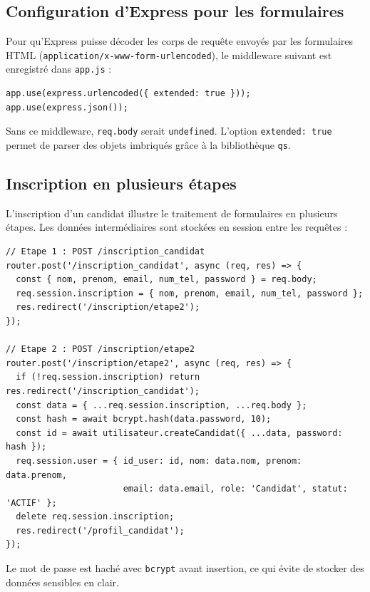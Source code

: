 \documentclass[12pt,a4paper]{article}
\begin{document}
\subsection{Configuration d'Express pour les formulaires}

Pour qu'Express puisse décoder les corps de requête envoyés par les formulaires HTML (\texttt{application/x-www-form-urlencoded}), le middleware suivant est enregistré dans \texttt{app.js} :

\begin{lstlisting}
app.use(express.urlencoded({ extended: true }));
app.use(express.json());
\end{lstlisting}

Sans ce middleware, \texttt{req.body} serait \texttt{undefined}. L'option \texttt{extended: true} permet de parser des objets imbriqués grâce à la bibliothèque \texttt{qs}.

\subsection{Inscription en plusieurs étapes}

L'inscription d'un candidat illustre le traitement de formulaires en plusieurs étapes. Les données intermédiaires sont stockées en session entre les requêtes :

\begin{lstlisting}
// Etape 1 : POST /inscription_candidat
router.post('/inscription_candidat', async (req, res) => {
  const { nom, prenom, email, num_tel, password } = req.body;
  req.session.inscription = { nom, prenom, email, num_tel, password };
  res.redirect('/inscription/etape2');
});

// Etape 2 : POST /inscription/etape2
router.post('/inscription/etape2', async (req, res) => {
  if (!req.session.inscription) return res.redirect('/inscription_candidat');
  const data = { ...req.session.inscription, ...req.body };
  const hash = await bcrypt.hash(data.password, 10);
  const id = await utilisateur.createCandidat({ ...data, password: hash });
  req.session.user = { id_user: id, nom: data.nom, prenom: data.prenom,
                       email: data.email, role: 'Candidat', statut: 'ACTIF' };
  delete req.session.inscription;
  res.redirect('/profil_candidat');
});
\end{lstlisting}

Le mot de passe est haché avec \texttt{bcrypt} avant insertion, ce qui évite de stocker des données sensibles en clair.
\end{document}
